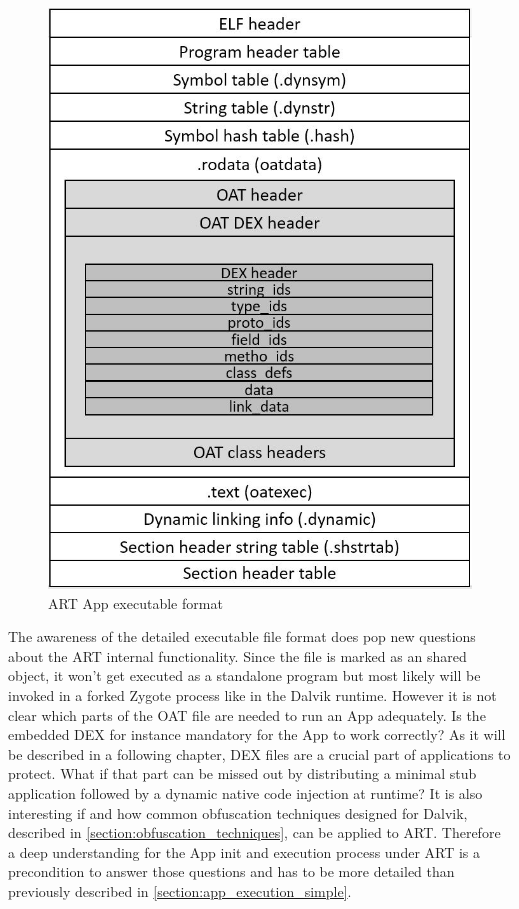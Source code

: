 \begin{figure}[htb]
  \centering
  \includegraphics[scale=0.5]{figures/andelf_format}
  \caption[ART App executable format]{ART App executable format}
  \label{fig:andelf_format}
\end{figure}

The awareness of the detailed executable file format does pop
new questions about the ART internal functionality.
Since the file is marked as an shared object, it won't get
executed as a standalone program but most likely will be
invoked in a forked Zygote process like in the Dalvik runtime.
However it is not clear which parts of the OAT file are
needed to run an App adequately. Is the embedded DEX for instance
mandatory for the App to work correctly? As it will be described
in a following chapter, DEX files are
a crucial part of applications to protect. What if that part
can be missed out by distributing a minimal stub application
followed by a dynamic native code injection at runtime?
It is also interesting if and how common obfuscation
techniques designed for Dalvik, described in \autoref{section:obfuscation_techniques}, can be applied to ART.
Therefore a deep understanding for the App init and execution
process under ART is a precondition to answer those
questions and has to be more detailed than previously described in
\autoref{section:app_execution_simple}.

